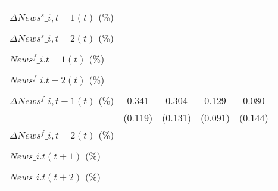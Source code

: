 {\begin{tabular}{l*{4}{c}}
                    &                     &                     &                     &                     \\
\addlinespace
$ \Delta News^s\_{i,t-1}(t)$ (\%)&                     &                     &                     &                     \\
                    &                     &                     &                     &                     \\
\addlinespace
$ \Delta News^s\_{i,t-2}(t)$ (\%)&                     &                     &                     &                     \\
                    &                     &                     &                     &                     \\
\addlinespace
$ News^f\_{i.t-1}(t)$ (\%)&                     &                     &                     &                     \\
                    &                     &                     &                     &                     \\
\addlinespace
$ News^f\_{i.t-2}(t)$ (\%)&                     &                     &                     &                     \\
                    &                     &                     &                     &                     \\
\addlinespace
$ \Delta News^f\_{i,t-1}(t)$ (\%)&       0.341\sym{***}&       0.304\sym{**} &       0.129         &       0.080         \\
                    &     (0.119)         &     (0.131)         &     (0.091)         &     (0.144)         \\
\addlinespace
$ \Delta News^f\_{i,t-2}(t)$ (\%)&                     &                     &                     &                     \\
                    &                     &                     &                     &                     \\
\addlinespace
$ News\_{i.t}(t+1)$ (\%)&                     &                     &                     &                     \\
                    &                     &                     &                     &                     \\
\addlinespace
$ News\_{i.t}(t+2)$ (\%)&                     &                     &                     &                     \\

\end{tabular}}
